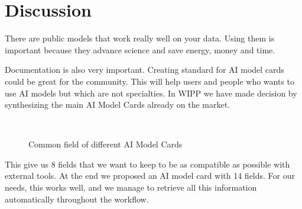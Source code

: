 \section{Discussion}
\label{sec:discussion}

There are public models that work really well on your data. Using them is
important because they advance science and save energy, money and time.

Documentation is also very important. Creating standard for AI model cards could
be great for the community. This will help users and people who wants to use AI
models but which are not specialties. In WIPP we have made decision by
synthesizing the main AI Model Cards already on the market.

\TODO\

\def\firstellip{(1.6, 0) ellipse [x radius=2.7cm, y radius=1.5cm, rotate=50]}
\def\secondellip{(0.3, 1cm) ellipse [x radius=2.7cm, y radius=1.5cm, rotate=50]}
\def\thirdellip{(-1.6, 0) ellipse [x radius=2.7cm, y radius=1.5cm, rotate=-50]}
\def\fourthellip{(-0.3, 1cm) ellipse [x radius=2.7cm, y radius=1.5cm, rotate=-50]}

\begin{figure}[H]
\centering
{}
\caption{Common field of different AI Model Cards} \label{fig:venn}
\end{figure}

This give us 8 fields that we want to keep to be as compatible as possible with
external tools. At the end we proposed an AI model card with 14 fields. For our
needs, this works well, and we manage to retrieve all this information
automatically throughout the workflow.

